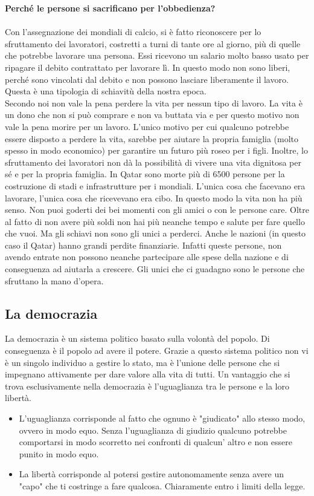 \documentclass[a4paper, 12pt]{article}
\begin{document}
\textbf{Perché le persone si sacrificano per l'obbedienza?} \\\\
Con l'assegnazione dei mondiali di calcio, si è fatto riconoscere per lo sfruttamento dei lavoratori, costretti a turni di tante ore al giorno, più di quelle che potrebbe lavorare una persona. Essi ricevono un salario molto basso usato per ripagare il debito contrattato per lavorare lì. In questo modo non sono liberi, perché sono vincolati dal debito e non possono lasciare liberamente il lavoro. Questa è una tipologia di schiavitù della nostra epoca. \\ Secondo noi non vale la pena perdere la vita per nessun tipo di lavoro. La vita è un dono che non si può comprare e non va buttata via e per questo motivo non vale la pena morire per un lavoro. L'unico motivo per cui qualcuno potrebbe essere disposto a perdere la vita, sarebbe per aiutare la propria famiglia (molto spesso in modo economico) per garantire un futuro più roseo per i figli. Inoltre, lo sfruttamento dei lavoratori non dà la possibilità di vivere una vita dignitosa per sé e per la propria famiglia. In Qatar sono morte più di 6500 persone per la costruzione di stadi e infrastrutture per i mondiali. L'unica cosa che facevano era lavorare, l'unica cosa che ricevevano era cibo. In questo modo la vita non ha più senso. Non puoi goderti dei bei momenti con gli amici o con le persone care. Oltre al fatto di non avere più soldi non hai più neanche tempo e salute per fare quello che vuoi. Ma gli schiavi non sono gli unici a perderci. Anche le nazioni (in questo caso il Qatar) hanno grandi perdite finanziarie. Infatti queste persone, non avendo entrate non possono neanche partecipare alle spese della nazione e di conseguenza ad aiutarla a crescere. Gli unici che ci guadagno sono le persone che sfruttano la mano d'opera.

\subsection{La democrazia}

La democrazia è un sistema politico basato sulla volontà del popolo. Di conseguenza è il popolo ad avere il potere. Grazie a questo sistema politico non vi è un singolo individuo a gestire lo stato, ma è l'unione delle persone che si impegnano attivamente per dare valore alla vita di tutti. Un vantaggio che si trova esclusivamente nella democrazia è l'uguaglianza tra le persone e la loro libertà.

\begin{itemize}
    \item L'uguaglianza corrisponde al fatto che ognuno è "giudicato" allo stesso modo, ovvero in modo equo. Senza l'uguaglianza di giudizio qualcuno potrebbe comportarsi in modo scorretto nei confronti di qualcun' altro e non essere punito in modo equo.
    \item La libertà corrisponde al potersi gestire autonomamente senza avere un "capo" che ti costringe a fare qualcosa. Chiaramente entro i limiti della legge.
\end{itemize}
\end{document}
